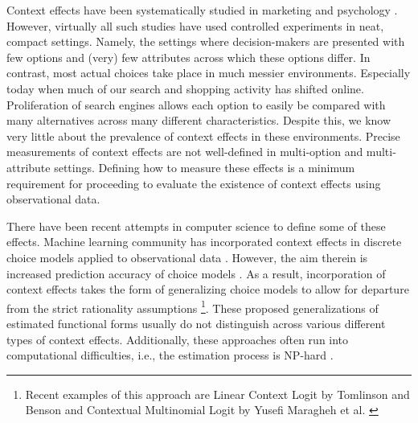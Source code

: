 \documentclass[a4paper,12pt]{article}
\newcommand{\citeyearonly}[1]{\citeyearpar{#1}}
\begin{document}
Context effects have been systematically studied in marketing and psychology \citep{kivetz04, roodrkerkEtAl11, frederickEtAl14, dotsonEtAl18}. However, virtually all such studies have used controlled experiments in neat, compact settings. Namely, the settings where decision-makers are presented with few options and (very) few attributes across which these options differ. In contrast, most actual choices take place in much messier environments. Especially today when much of our search and shopping activity has shifted online. Proliferation of search engines allows each option to easily be compared with many alternatives across many different characteristics. Despite this, we know very little about the prevalence of context effects in these environments. Precise measurements of context effects are not well-defined in multi-option and multi-attribute settings. Defining how to measure these effects is a minimum requirement for proceeding to evaluate the existence of context effects using observational data.

There have been recent attempts in computer science to define some of these effects. Machine learning community has incorporated context effects in discrete choice models applied to observational data \citep{pfannschmidt2019learning, bowerBalzano20}. However, the aim therein is increased prediction accuracy of choice models \citep{tomlinsonBenson21}. As a result, incorporation of context effects takes the form of generalizing choice models to allow for departure from the strict rationality assumptions \footnote{Recent examples of this approach are Linear Context Logit by Tomlinson and Benson \citeyearonly{tomlinsonBenson21} and Contextual Multinomial Logit by Yusefi Maragheh et al. \citeyearonly{yousefi2020choice}}.  These proposed generalizations of estimated functional forms usually do not distinguish across various different types of context effects. Additionally, these approaches often run into computational difficulties, i.e., the estimation process is NP-hard \citep{yousefi2020choice}.
\end{document}
